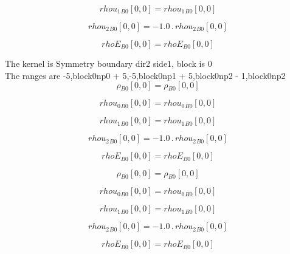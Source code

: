 \documentclass{article}
\begin{document}
\begin{dmath}{rhou_{1}{_{B0}}}[{0,0}] = {rhou_{1}{_{B0}}}[{0,0}]\end{dmath}

\begin{dmath}{rhou_{2}{_{B0}}}[{0,0}] = - 1.0 \,.\, {rhou_{2}{_{B0}}}[{0,0}]\end{dmath}

\begin{dmath}{rhoE{_{B0}}}[{0,0}] = {rhoE{_{B0}}}[{0,0}]\end{dmath}

\noindent The kernel is Symmetry boundary dir2 side1, block is 0\\\noindent The ranges are -5,block0np0 + 5,-5,block0np1 + 5,block0np2 - 1,block0np2\\\begin{dmath}{\rho{_{B0}}}[{0,0}] = {\rho{_{B0}}}[{0,0}]\end{dmath}

\begin{dmath}{rhou_{0}{_{B0}}}[{0,0}] = {rhou_{0}{_{B0}}}[{0,0}]\end{dmath}

\begin{dmath}{rhou_{1}{_{B0}}}[{0,0}] = {rhou_{1}{_{B0}}}[{0,0}]\end{dmath}

\begin{dmath}{rhou_{2}{_{B0}}}[{0,0}] = - 1.0 \,.\, {rhou_{2}{_{B0}}}[{0,0}]\end{dmath}

\begin{dmath}{rhoE{_{B0}}}[{0,0}] = {rhoE{_{B0}}}[{0,0}]\end{dmath}

\begin{dmath}{\rho{_{B0}}}[{0,0}] = {\rho{_{B0}}}[{0,0}]\end{dmath}

\begin{dmath}{rhou_{0}{_{B0}}}[{0,0}] = {rhou_{0}{_{B0}}}[{0,0}]\end{dmath}

\begin{dmath}{rhou_{1}{_{B0}}}[{0,0}] = {rhou_{1}{_{B0}}}[{0,0}]\end{dmath}

\begin{dmath}{rhou_{2}{_{B0}}}[{0,0}] = - 1.0 \,.\, {rhou_{2}{_{B0}}}[{0,0}]\end{dmath}

\begin{dmath}{rhoE{_{B0}}}[{0,0}] = {rhoE{_{B0}}}[{0,0}]\end{dmath}
\end{document}
